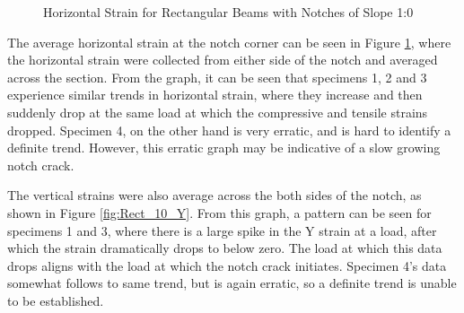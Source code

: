 \documentclass[11pt,a4paper]{article}
\numberwithin{equation}{subsection}
\begin{document}
\begin{figure}[h]
	\begin{center}
	\end{center}
	\caption{Horizontal Strain for Rectangular Beams with Notches of Slope 1:0}
	\label{fig:Rect_10_Z}
\end{figure}
\pagebreak

\noindent
The average horizontal strain at the notch corner can be seen in Figure \ref{fig:Rect_10_Z}, where the horizontal strain were collected from either side of the notch and averaged across the section. From the graph, it can be seen that specimens 1, 2 and 3 experience similar trends in horizontal strain, where they increase and then suddenly drop at the same load at which the compressive and tensile strains dropped. Specimen 4, on the other hand is very erratic, and is hard to identify a definite trend. However, this erratic graph may be indicative of a slow growing notch crack.

\vspace*{\baselineskip}

\noindent
The vertical strains were also average across the both sides of the notch, as shown in Figure \ref{fig:Rect_10_Y}. From this graph, a pattern can be seen for specimens 1 and 3, where there is a large spike in the Y strain at a load, after which the strain dramatically drops to below zero. The load at which this data drops aligns with the load at which the notch crack initiates. Specimen 4's data somewhat follows to same trend, but is again erratic, so a definite trend is unable to be established. 
\end{document}

